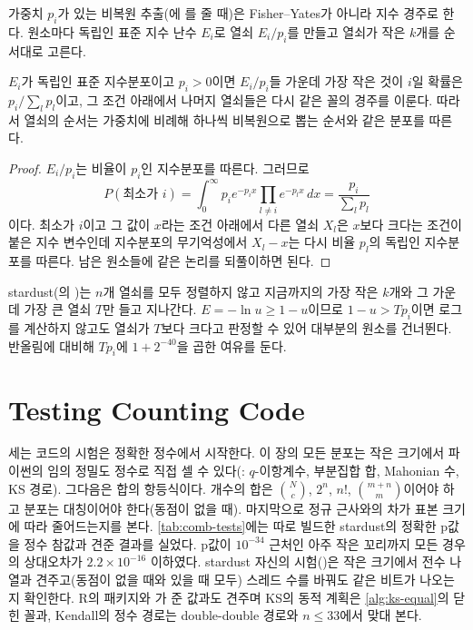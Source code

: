 가중치 $p_i$가 있는 비복원 추출(에 를 줄 때)은 Fisher--Yates가 아니라 지수 경주로 한다. 원소마다 독립인 표준 지수 난수 $E_i$로 열쇠 $E_i/p_i$를 만들고 열쇠가 작은 $k$개를 순서대로 고른다\cite{efraimidis2006}.

\begin{proposition}
\label{prop:race}
$E_i$가 독립인 표준 지수분포이고 $p_i>0$이면 $E_i/p_i$들 가운데 가장 작은 것이 $i$일 확률은 $p_i/\sum_lp_l$이고, 그 조건 아래에서 나머지 열쇠들은 다시 같은 꼴의 경주를 이룬다. 따라서 열쇠의 순서는 가중치에 비례해 하나씩 비복원으로 뽑는 순서와 같은 분포를 따른다.
\end{proposition}

\begin{proof}
$E_i/p_i$는 비율이 $p_i$인 지수분포를 따른다. 그러므로
\[
P(\text{최소가 }i)=\int_0^\infty p_ie^{-p_ix}\prod_{l\ne i}e^{-p_lx}\,dx=\frac{p_i}{\sum_lp_l}
\]
이다. 최소가 $i$이고 그 값이 $x$라는 조건 아래에서 다른 열쇠 $X_l$은 $x$보다 크다는 조건이 붙은 지수 변수인데 지수분포의 무기억성에서 $X_l-x$는 다시 비율 $p_l$의 독립인 지수분포를 따른다. 남은 원소들에 같은 논리를 되풀이하면 된다.
\end{proof}

stardust(의 )는 $n$개 열쇠를 모두 정렬하지 않고 지금까지의 가장 작은 $k$개와 그 가운데 가장 큰 열쇠 $T$만 들고 지나간다. $E=-\ln u\ge1-u$이므로 $1-u>Tp_i$이면 로그를 계산하지 않고도 열쇠가 $T$보다 크다고 판정할 수 있어 대부분의 원소를 건너뛴다. 반올림에 대비해 $Tp_i$에 $1+2^{-40}$을 곱한 여유를 둔다.

\section{Testing Counting Code}
\label{sec:comb-testing}

세는 코드의 시험은 정확한 정수에서 시작한다. 이 장의 모든 분포는 작은 크기에서 파이썬의 임의 정밀도 정수로 직접 셀 수 있다(: $q$-이항계수, 부분집합 합, Mahonian 수, KS 경로). 그다음은 합의 항등식이다. 개수의 합은 $\binom Nc$, $2^n$, $n!$, $\binom{m+n}m$이어야 하고 분포는 대칭이어야 한다(동점이 없을 때). 마지막으로 정규 근사와의 차가 표본 크기에 따라 줄어드는지를 본다. \cref{tab:comb-tests}에는 따로 빌드한 stardust의 정확한 p값을 정수 참값과 견준 결과를 실었다. p값이 $10^{-34}$ 근처인 아주 작은 꼬리까지 모든 경우의 상대오차가 $2.2\times10^{-16}$ 이하였다. stardust 자신의 시험()은 작은 크기에서 전수 나열과 견주고(동점이 없을 때와 있을 때 모두) 스레드 수를 바꿔도 같은 비트가 나오는지 확인한다. R의  패키지와 가 준 값과도 견주며 KS의 동적 계획은 \cref{alg:ks-equal}의 닫힌 꼴과, Kendall의 정수 경로는 double-double 경로와 $n\le33$에서 맞대 본다.

